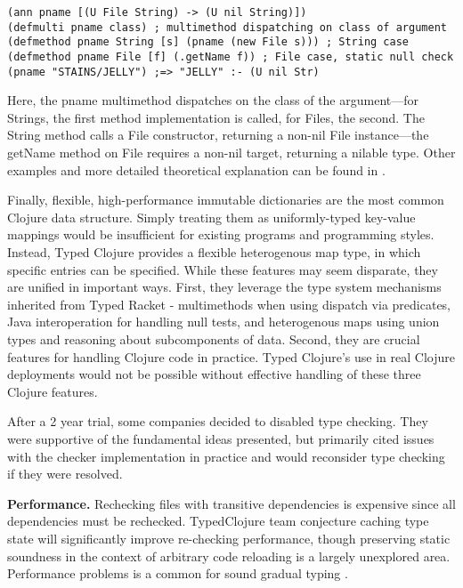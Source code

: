 \begin{verbatim}
(ann pname [(U File String) -> (U nil String)])
(defmulti pname class) ; multimethod dispatching on class of argument
(defmethod pname String [s] (pname (new File s))) ; String case
(defmethod pname File [f] (.getName f)) ; File case, static null check
(pname "STAINS/JELLY") ;=> "JELLY" :- (U nil Str)
\end{verbatim}

Here, the pname multimethod dispatches on the class of the argument—for Strings,
the first method implementation is called, for Files, the second. The String
method calls a File constructor, returning a non-nil File instance—the getName
method on File requires a non-nil target, returning a nilable type. Other
examples and more detailed theoretical explanation can be found in
\cite{bonnaire2016practical}.

Finally, flexible, high-performance immutable dictionaries are the most common Clojure
data structure. Simply treating them as uniformly-typed key-value mappings would
be insufficient for existing programs and programming styles. Instead, Typed
Clojure provides a flexible heterogenous map type, in which specific entries can
be specified. While these features may seem disparate, they are unified in
important ways. First, they leverage the type system mechanisms inherited from
Typed Racket - multimethods when using dispatch via predicates, Java
interoperation for handling null tests, and heterogenous maps using union types
and reasoning about subcomponents of data. Second, they are crucial features for
handling Clojure code in practice. Typed Clojure’s use in real Clojure
deployments would not be possible without effective handling of these three
Clojure features.

After a 2 year trial, some companies \cite{clojuretypedescape} decided to
disabled type checking. They were supportive of the fundamental ideas presented,
but primarily cited issues with the checker implementation in practice and would
reconsider type checking if they were resolved.

\textbf{Performance.} Rechecking files with transitive dependencies is expensive
since all dependencies must be rechecked. TypedClojure team conjecture caching
type state will significantly improve re-checking performance, though preserving
static soundness in the context of arbitrary code reloading is a largely
unexplored area. Performance problems is a common for sound gradual typing
\cite{takikawa2016sound}.

